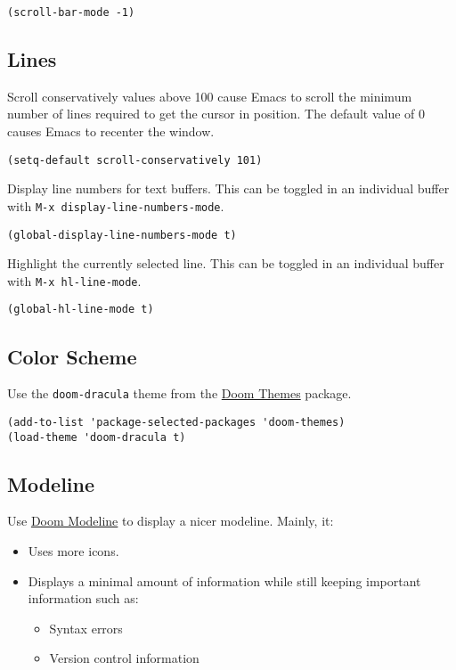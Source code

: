 \documentclass[11pt]{article}
\begin{document}
\begin{verbatim}
(scroll-bar-mode -1)
\end{verbatim}
\subsection{Lines}
\label{sec:org5c95215}

Scroll conservatively values above 100 cause Emacs to scroll the
minimum number of lines required to get the cursor in position. The
default value of 0 causes Emacs to recenter the window.

\begin{verbatim}
(setq-default scroll-conservatively 101)
\end{verbatim}

Display line numbers for text buffers. This can be toggled in an individual
buffer with \texttt{M-x display-line-numbers-mode}.

\begin{verbatim}
(global-display-line-numbers-mode t)
\end{verbatim}

Highlight the currently selected line. This can be toggled in an individual
buffer with \texttt{M-x hl-line-mode}.

\begin{verbatim}
(global-hl-line-mode t)
\end{verbatim}
\subsection{Color Scheme}
\label{sec:orgd1b90c4}

Use the \texttt{doom-dracula} theme from the \href{https://github.com/doomemacs/themes/tree/729ad034631cba41602ad9191275ece472c21941}{Doom Themes} package.

\begin{verbatim}
(add-to-list 'package-selected-packages 'doom-themes)
(load-theme 'doom-dracula t)
\end{verbatim}
\subsection{Modeline}
\label{sec:org522bfc8}

Use \href{https://github.com/seagle0128/doom-modeline/tree/297b57585fe3b3de9e694512170c44c6e104808f}{Doom Modeline} to display a nicer modeline. Mainly, it:

\begin{itemize}
\item Uses more icons.
\item Displays a minimal amount of information while still keeping
important information such as:
\begin{itemize}
\item Syntax errors
\item Version control information
\end{itemize}
\end{itemize}
\end{document}
